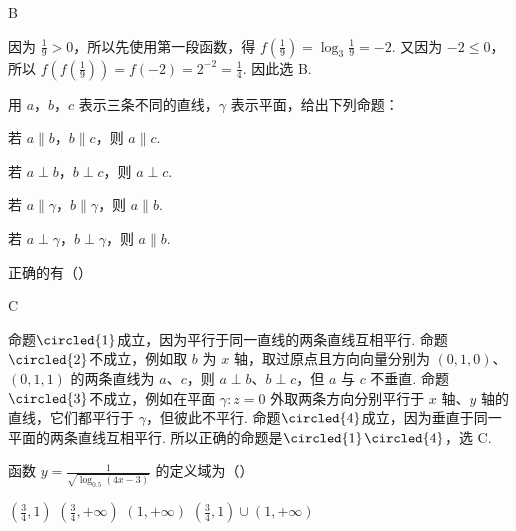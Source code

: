 \begin{answer}
B
\end{answer}

\begin{solution}
因为 \(\frac{1}{9}>0\)，所以先使用第一段函数，得 \(f\left(\frac{1}{9}\right)=\log_3\frac{1}{9}=-2\). 又因为 \(-2\leqslant0\)，所以 \(f\left(f\left(\frac{1}{9}\right)\right)=f(-2)=2^{-2}=\frac{1}{4}\). 因此选 B.
\end{solution}

\begin{problem}
用 \(a\)，\(b\)，\(c\) 表示三条不同的直线，\(\gamma\) 表示平面，给出下列命题：

\begin{circlelist}
\item 若 \(a \parallel b\)，\(b \parallel c\)，则 \(a \parallel c\).
\item 若 \(a \perp b\)，\(b \perp c\)，则 \(a \perp c\).
\item 若 \(a \parallel \gamma\)，\(b \parallel \gamma\)，则 \(a \parallel b\).
\item 若 \(a \perp \gamma\)，\(b \perp \gamma\)，则 \(a \parallel b\).
\end{circlelist}

正确的有（\quad）

\choices
    {}
    {}
    {}
    {}
\end{problem}

\begin{answer}
C
\end{answer}

\begin{solution}
命题\(\circled{1}\)成立，因为平行于同一直线的两条直线互相平行. 命题\(\circled{2}\)不成立，例如取 \(b\) 为 \(x\) 轴，取过原点且方向向量分别为 \((0,1,0)\)、\((0,1,1)\) 的两条直线为 \(a\)、\(c\)，则 \(a\perp b\)、\(b\perp c\)，但 \(a\) 与 \(c\) 不垂直. 命题\(\circled{3}\)不成立，例如在平面 \(\gamma:z=0\) 外取两条方向分别平行于 \(x\) 轴、\(y\) 轴的直线，它们都平行于 \(\gamma\)，但彼此不平行. 命题\(\circled{4}\)成立，因为垂直于同一平面的两条直线互相平行. 所以正确的命题是\(\circled{1}\)\(\circled{4}\)，选 C.
\end{solution}

\begin{problem}
函数 \( y = \frac{1}{\sqrt{\log_{0.5}(4x - 3)}} \) 的定义域为（\quad）

\choices
    {\(\left(\frac{3}{4}, 1\right)\)}
    {\(\left(\frac{3}{4}, +\infty\right)\)}
    {\((1, +\infty)\)}
    {\(\left(\frac{3}{4}, 1\right) \cup (1, +\infty)\)}
\end{problem}


